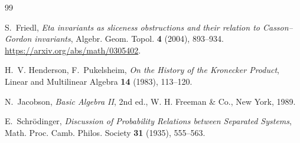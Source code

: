 \begin{thebibliography}{99}

S.~Friedl, \textit{Eta invariants as sliceness obstructions and their relation to Casson--Gordon invariants}, Algebr. Geom. Topol. \textbf{4} (2004), 893--934. 
\url{https://arxiv.org/abs/math/0305402}.

H.~V. Henderson, F.~Pukelsheim, \textit{On the History of the Kronecker Product}, Linear and Multilinear Algebra \textbf{14} (1983), 113--120.

N.~Jacobson, \textit{Basic Algebra II}, 2nd ed., W. H. Freeman \& Co., New York, 1989.

E.~Schr\"odinger, \textit{Discussion of Probability Relations between Separated Systems}, Math. Proc. Camb. Philos. Society \textbf{31} (1935), 555--563.

\end{thebibliography}
